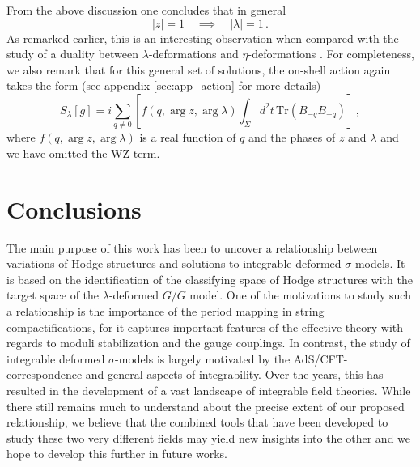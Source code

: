 \documentclass[11pt,a4paper]{article}
\numberwithin{equation}{section}
\numberwithin{table}{section}\setlength{\multlinegap}{25pt}
\begin{document}
From the above discussion one concludes that in general
\begin{equation}
	|z|=1\quad\implies\quad |\lambda|=1\,.
\end{equation}
As remarked earlier, this is an interesting observation when compared with the study of a duality between $\lambda$-deformations and $\eta$-deformations \cite{Klimcik_2015}. For completeness, we also remark that for this general set of solutions, the on-shell action again takes the form (see appendix \ref{sec:app_action} for more details)
\begin{equation}
	S_\lambda[g] = i \sum_{q\neq 0}\left[ f(q,\arg z,\arg \lambda) \int_\Sigma d^2t \,\mathrm{Tr}\left(B_{-q}\bar{B}_{+q}\right)\right]\,,
\end{equation}
where $f(q,\arg z,\arg \lambda)$ is a real function of $q$ and the phases of $z$ and $\lambda$ and we have omitted the WZ-term.

\section{Conclusions}

The main purpose of this work has been to uncover a relationship between variations of Hodge structures and solutions to integrable deformed $\sigma$-models. It is based on the identification of the classifying space of Hodge structures with the target space of the $\lambda$-deformed $G/G$ model. One of the motivations to study such a relationship is the importance of the period mapping in string compactifications, for it captures important features of the effective theory with regards to moduli stabilization and the gauge couplings. In contrast, the study of integrable deformed $\sigma$-models is largely motivated by the AdS/CFT-correspondence and general aspects of integrability. Over the years, this has resulted in the development of a vast landscape of integrable field theories. While there still remains much to understand about the precise extent of our proposed relationship, we believe that the combined tools that have been developed to study these two very different fields may yield new insights into the other and we hope to develop this further in future works. 
\end{document}
